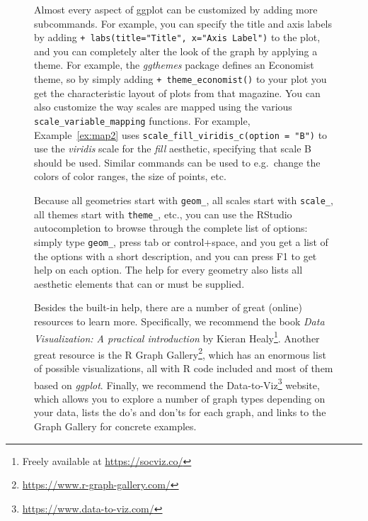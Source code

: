 \begin{figure}
\begin{feature}
Almost every aspect of ggplot can be customized by adding more subcommands.
For example, you can specify the title and axis labels by adding \verb|+ labs(title="Title", x="Axis Label")| to the plot,
and you can completely alter the look of the graph by applying a theme.
For example, the \emph{ggthemes} package defines an Economist theme, so by simply adding \verb|+ theme_economist()| to your plot you get the characteristic layout of plots from that magazine.
You can also customize the way scales are mapped using the various \texttt{scale\_variable\_mapping} functions.
For example, Example~\ref{ex:map2} uses \verb|scale_fill_viridis_c(option = "B")| to use the \emph{viridis} scale for the \emph{fill} aesthetic, specifying that scale B should be used. Similar commands can be used to e.g.\ change the colors of color ranges, the size of points, etc.

Because all geometries start with \verb|geom_|, all scales start with \verb|scale_|, all themes start with \verb|theme_|, etc.,
you can use the RStudio autocompletion to browse through the complete list of options:
simply type \verb|geom_|, press tab or control+space, and you get a list of the options with a short description, and you can press F1 to get help on each option. The help for every geometry also lists all aesthetic elements that can or must be supplied.

\nocite{healy2018data}

Besides the built-in help, there are a number of great (online) resources to learn more. Specifically, we recommend the book \emph{Data Visualization: A practical introduction} by Kieran Healy\footnote{Freely available at \url{https://socviz.co/}}. Another great resource is the R Graph Gallery\footnote{\url{https://www.r-graph-gallery.com/}}, which has an enormous list of possible visualizations, all with R code included and most of them based on \emph{ggplot}. Finally, we recommend the Data-to-Viz\footnote{\url{https://www.data-to-viz.com/}} website, which allows you to explore a number of graph types depending on your data, lists the do's and don'ts for each graph, and links to the Graph Gallery for concrete examples.
\end{feature}
\end{figure}


